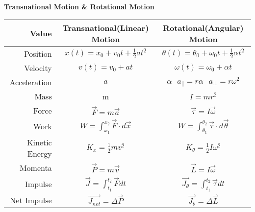 \documentclass[12pt,letterpaper,fleqn]{article}
\begin{document}
\begin{center}
{\LARGE\bf Transnational Motion \& Rotational Motion  }
\end{center}

\begin{table}[htb]
\begin{center}
	\begin{tabular}{|r||c|c|}\hline
	Value & Transnational(Linear) Motion & Rotational(Angular) Motion \\\hline\hline
    Position & $x(t) = x_0 + v_0t + \frac{1}{2}at^2 $ &
     $\theta(t) = \theta_0 + \omega_0t + \frac{1}{2} \alpha t^2$ \\\hline
    Velocity & $ v(t) = v_0 + at $ & 
    $\omega(t) = \omega_0 + \alpha t $\\\hline
    Acceleration & $ a $ & $\alpha \ \ \  a_{\parallel} = r\alpha \ \ \  a_{\bot} = r\omega^2 $\\\hline
    Mass & m & $ I = mr^2 $\\\hline
    Force & $\vec{F} = m\vec{a}$ & $\vec{\tau} = I\vec{\omega}$ \\\hline
    Work & $ W = \int_{x_1}^{x_2} \vec{F}\cdot d\vec{x}$ & $ W =\int_{\theta_1}^{\theta_2} \vec{\tau} \cdot d\vec{\theta}$\\\hline
    Kinetic Energy & $K_x = \frac{1}{2}mv^2 $ & $K_{\theta} = \frac{1}{2}I\omega^2 $\\\hline
    Momenta & $\vec{P} = m\vec{v} $ & $\vec{L} = I\vec{\omega} $\\\hline
    Impulse & $\vec{J} = \int_{t_1}^{t_2} \vec{F}dt $ & $ \vec{J_\theta} = \int_{t_1}^{t_2} \vec{\tau}dt$ \\\hline
    Net Impulse & $\vec{J_{net}} = \Delta \vec{P}$& $\vec{J_{\theta}} = \Delta \vec{L}$\\\hline
	\end{tabular} 
\end{center}
\end{table}
\end{document}
